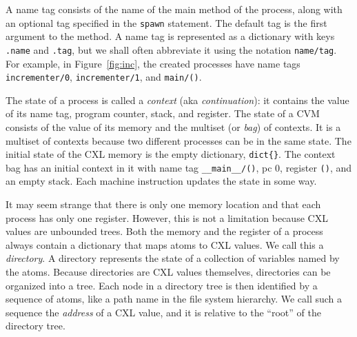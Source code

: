 \documentclass{report}
\begin{document}
A name tag consists of the name of the main method of the process,
along with an optional tag specified in the \texttt{spawn}
statement.
The default tag is the first argument to the method.
A name tag is represented as a dictionary with keys \texttt{.name}
and \texttt{.tag}, but we shall often abbreviate it using the notation
\texttt{name/tag}.
For example, in Figure~\ref{fig:inc}, the created processes have name tags
\texttt{incrementer/0}, \texttt{incrementer/1}, and \texttt{main/()}.

The state of a process is called a \emph{context} (aka \emph{continuation}):
it contains the value of
its name tag, program counter, stack, and register.
The state of a CVM
consists of the value of its memory and the multiset (or \emph{bag})
of contexts.  It is a multiset of contexts because two different processes can
be in the same state.
The initial state of the CXL memory is the empty dictionary, \texttt{dict\{\}}.
The context bag has an initial context in it with name tag
\texttt{\_\_main\_\_/()}, pc 0, register \texttt{()}, and an empty stack.
Each machine instruction updates the state in some way.


It may seem strange that there is only one memory location and that each
process has only one register.  However, this is not a limitation because
CXL values are unbounded trees.
Both the memory and the register of a process always contain
a dictionary that maps atoms to CXL values.  We call this a \emph{directory}.
A directory represents the state of a collection of variables named by the atoms.
%
Because directories are CXL values themselves,
directories can be organized into a tree.
Each node in a directory tree is then identified
by a sequence of atoms, like a path name in the file system hierarchy.  We call
such a sequence the \emph{address}
of a CXL value, and it is relative to the
``root'' of the directory tree.
\end{document}
